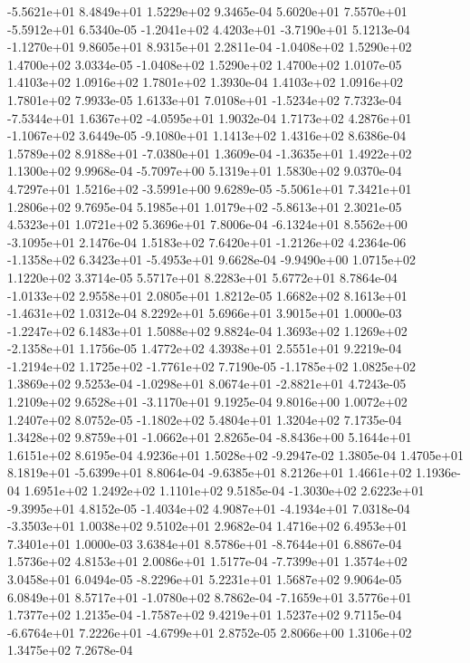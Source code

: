 -5.5621e+01  8.4849e+01  1.5229e+02  9.3465e-04
 5.6020e+01  7.5570e+01 -5.5912e+01  6.5340e-05
-1.2041e+02  4.4203e+01 -3.7190e+01  5.1213e-04
-1.1270e+01  9.8605e+01  8.9315e+01  2.2811e-04
-1.0408e+02  1.5290e+02  1.4700e+02  3.0334e-05
-1.0408e+02  1.5290e+02  1.4700e+02  1.0107e-05
1.4103e+02 1.0916e+02 1.7801e+02  1.3930e-04
1.4103e+02 1.0916e+02 1.7801e+02  7.9933e-05
 1.6133e+01  7.0108e+01 -1.5234e+02  7.7323e-04
-7.5344e+01  1.6367e+02 -4.0595e+01  1.9032e-04
 1.7173e+02  4.2876e+01 -1.1067e+02  3.6449e-05
-9.1080e+01  1.1413e+02  1.4316e+02  8.6386e-04
 1.5789e+02  8.9188e+01 -7.0380e+01  1.3609e-04
-1.3635e+01  1.4922e+02  1.1300e+02  9.9968e-04
-5.7097e+00  5.1319e+01  1.5830e+02  9.0370e-04
 4.7297e+01  1.5216e+02 -3.5991e+00  9.6289e-05
-5.5061e+01  7.3421e+01  1.2806e+02  9.7695e-04
 5.1985e+01  1.0179e+02 -5.8613e+01  2.3021e-05
4.5323e+01 1.0721e+02 5.3696e+01  7.8006e-04
-6.1324e+01  8.5562e+00 -3.1095e+01  2.1476e-04
 1.5183e+02  7.6420e+01 -1.2126e+02  4.2364e-06
-1.1358e+02  6.3423e+01 -5.4953e+01  9.6628e-04
-9.9490e+00  1.0715e+02  1.1220e+02  3.3714e-05
5.5717e+01 8.2283e+01 5.6772e+01  8.7864e-04
-1.0133e+02  2.9558e+01  2.0805e+01  1.8212e-05
 1.6682e+02  8.1613e+01 -1.4631e+02  1.0312e-04
8.2292e+01 5.6966e+01 3.9015e+01  1.0000e-03
-1.2247e+02  6.1483e+01  1.5088e+02  9.8824e-04
 1.3693e+02  1.1269e+02 -2.1358e+01  1.1756e-05
1.4772e+02 4.3938e+01 2.5551e+01  9.2219e-04
-1.2194e+02  1.1725e+02 -1.7761e+02  7.7190e-05
-1.1785e+02  1.0825e+02  1.3869e+02  9.5253e-04
-1.0298e+01  8.0674e+01 -2.8821e+01  4.7243e-05
 1.2109e+02  9.6528e+01 -3.1170e+01  9.1925e-04
9.8016e+00 1.0072e+02 1.2407e+02  8.0752e-05
-1.1802e+02  5.4804e+01  1.3204e+02  7.1735e-04
 1.3428e+02  9.8759e+01 -1.0662e+01  2.8265e-04
-8.8436e+00  5.1644e+01  1.6151e+02  8.6195e-04
 4.9236e+01  1.5028e+02 -9.2947e-02  1.3805e-04
 1.4705e+01  8.1819e+01 -5.6399e+01  8.8064e-04
-9.6385e+01  8.2126e+01  1.4661e+02  1.1936e-04
1.6951e+02 1.2492e+02 1.1101e+02  9.5185e-04
-1.3030e+02  2.6223e+01 -9.3995e+01  4.8152e-05
-1.4034e+02  4.9087e+01 -4.1934e+01  7.0318e-04
-3.3503e+01  1.0038e+02  9.5102e+01  2.9682e-04
1.4716e+02 6.4953e+01 7.3401e+01  1.0000e-03
 3.6384e+01  8.5786e+01 -8.7644e+01  6.8867e-04
1.5736e+02 4.8153e+01 2.0086e+01  1.5177e-04
-7.7399e+01  1.3574e+02  3.0458e+01  6.0494e-05
-8.2296e+01  5.2231e+01  1.5687e+02  9.9064e-05
 6.0849e+01  8.5717e+01 -1.0780e+02  8.7862e-04
-7.1659e+01  3.5776e+01  1.7377e+02  1.2135e-04
-1.7587e+02  9.4219e+01  1.5237e+02  9.7115e-04
-6.6764e+01  7.2226e+01 -4.6799e+01  2.8752e-05
2.8066e+00 1.3106e+02 1.3475e+02  7.2678e-04
